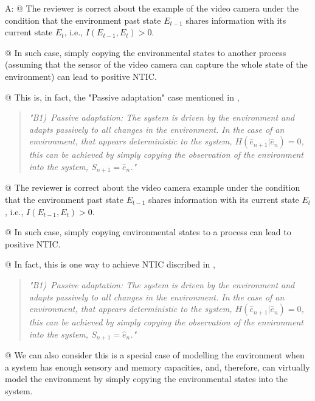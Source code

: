 \documentclass[utf8]{article}
\newenvironment{ans}  
    {\color{Black}\noindent A:}
    {~\newline}
\begin{document}
        \begin{ans}
		    @ The reviewer is correct about the example of the video camera under the condition that the environment past state $E_{t-1}$ shares information with its current state $E_t$, i.e., $I(E_{t-1}, E_t)>0$. 
		    
		    @ In such case, simply copying the environmental states to another process (assuming that the sensor of the video camera can capture the whole state of the environment) can lead to positive NTIC. 
		    
		    @ This is, in fact, the "Passive adaptation" case mentioned in \cite[p.~4]{BERTSCHINGER.2006},	
		    \begin{quote}
			      	\textit{"B1)~Passive adaptation: The system is driven by the environment and adapts passively to all changes in the environment. In the case of an environment, that appears deterministic to the system, $H(\hat{e}_{n+1} |\hat{e}_n)=0$, this can be achieved by simply copying the observation of the environment into the system, $S_{n+1} = \hat{e}_n$."}        
		    \end{quote} 
	    
	    
	    @ The reviewer is correct about the video camera example under the condition that the environment past state $E_{t-1}$ shares information with its current state $E_t$, i.e., $I(E_{t-1}, E_t)>0$. 
	    
	    @ In such case, simply copying environmental states to a process can lead to positive NTIC. 
	    
	    @ In fact, this is one way to achieve NTIC discribed in \cite[p.~4]{BERTSCHINGER.2006},    
	    \begin{quote}
	    	\textit{"B1)~Passive adaptation: The system is driven by the environment and adapts passively to all changes in the environment. In the case of an environment, that appears deterministic to the system, $H(\hat{e}_{n+1} |\hat{e}_n)=0$, this can be achieved by simply copying the observation of the environment into the system, $S_{n+1} = \hat{e}_n$."}        
	    \end{quote} 
	    
	    @ We can also consider this is a special case of modelling the environment when a system has enough sensory and memory capacities, and, therefore, can virtually model the environment by simply copying the environmental states into the system.  


\end{ans}
\end{document}
